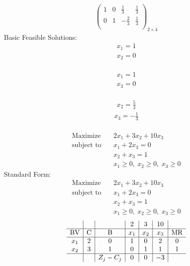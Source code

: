 \documentclass{article}
\begin{document}
\begin{align*}
\left(
\begin{array}{cc|cc}
1 & 0 & \frac{1}{3} & \frac{1}{3}\\
0 & 1 & -\frac{2}{3} & \frac{1}{3}\\
\end{array}
\right)_{2\times 4}
\end{align*}
Basic Feasible Solutions:\\
\begin{align*}
x_{1}=1\end{align*}
  \begin{align*}
x_{2}=0\end{align*}
  \\
\begin{align*}
x_{1}=1\end{align*}
  \begin{align*}
x_{3}=0\end{align*}
  \\
\begin{align*}
x_{2}=\frac{5}{3}\end{align*}
  \begin{align*}
x_{3}=-\frac{1}{3}\end{align*}
  \\
\begin{align*}
\text{Maximize} \quad & 2x_{1} + 3x_{2} + 10x_{3}\\
\text{subject to} \quad
& x_{1} + 2x_{3}=0\\
& x_{2} + x_{3}=1\\
& x_{1}\ge0,\; x_{2}\ge0,\; x_{3}\ge0\end{align*}
Standard Form:\\
\begin{align*}
\text{Maximize} \quad & 2x_{1} + 3x_{2} + 10x_{3}\\
\text{subject to} \quad
& x_{1} + 2x_{3}=0\\
& x_{2} + x_{3}=1\\
& x_{1}\ge0,\; x_{2}\ge0,\; x_{3}\ge0\end{align*}
\begin{align*}
\begin{array}{c|c|c|c|c|c|c}
 &  &  & 2 & 3 & 10 & \\
\hline
\text{BV} & \text{C} & \text{B} & x_{1} & x_{2} & x_{3} & \text{MR} \\
\hline
x_{1} & 2 & 0 & 1 & 0 & 2 & 0 \\
x_{2} & 3 & 1 & 0 & 1 & 1 & 1 \\
\hline
 &  & Z_j-C_j & 0 & 0 & -3 & \\
\end{array}
\end{align*}
\end{document}
